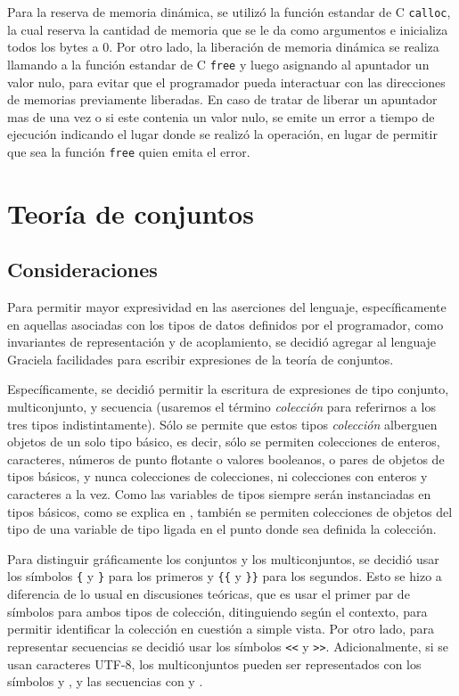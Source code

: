 Para la reserva de memoria dinámica, se utilizó la función estandar de C
\texttt{calloc}, la cual reserva la cantidad de memoria que se le da como
argumentos e inicializa todos los bytes a 0. Por otro lado, la liberación de
memoria dinámica se realiza llamando a la función estandar de C \texttt{free} y
luego asignando al apuntador un valor nulo, para evitar que el programador pueda
interactuar con las direcciones de memorias previamente liberadas. En caso de
tratar de liberar un apuntador mas de una vez o si este contenia un valor nulo,
se emite un error a tiempo de ejecución indicando el lugar donde se realizó la
operación, en lugar de permitir que sea la función \texttt{free} quien emita el
error.

\section{Teoría de conjuntos}
\subsection{Consideraciones}

Para permitir mayor expresividad en las aserciones del lenguaje, específicamente
en aquellas asociadas con los tipos de datos definidos por el programador, como
invariantes de representación y de acoplamiento, se decidió agregar al lenguaje
Graciela facilidades para escribir expresiones de la teoría de conjuntos.

Específicamente, se decidió permitir la escritura de expresiones de tipo
conjunto, multiconjunto, y secuencia (usaremos el término \textit{colección}
para referirnos a los tres tipos indistintamente). Sólo se permite que estos
tipos \textit{colección} alberguen objetos de un solo tipo básico, es decir,
sólo se permiten colecciones de enteros, caracteres, números de punto flotante o
valores booleanos, o pares de objetos de tipos básicos, y nunca colecciones de
colecciones, ni colecciones con enteros y caracteres a la vez. Como las
variables de tipos siempre serán instanciadas en tipos básicos, como se explica
en , también se permiten colecciones de
objetos del tipo de una variable de tipo ligada en el punto donde sea definida
la colección.

Para distinguir gráficamente los conjuntos y los multiconjuntos, se decidió usar
los símbolos \texttt{\{} y \texttt{\}} para los primeros y \texttt{\{\{} y
\texttt{\}\}} para los segundos. Esto se hizo a diferencia de lo usual en
discusiones teóricas, que es usar el primer par de símbolos para ambos tipos de
colección, ditinguiendo según el contexto, para permitir identificar la
colección en cuestión a simple vista. Por otro lado, para representar secuencias
se decidió usar los símbolos \texttt{<\null<} y \texttt{>\null>}.
Adicionalmente, si se usan caracteres UTF-8, los multiconjuntos pueden ser
representados con los símbolos \texttt{\Lbag} y \texttt{\Rbag}, y las secuencias
con \texttt{\Lseq} y \texttt{\Rseq}.

